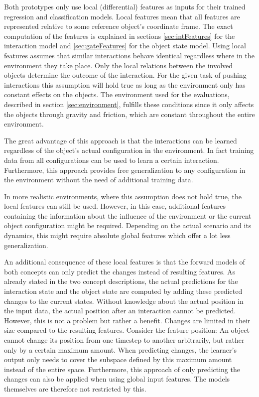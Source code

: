 Both prototypes only use local (differential) features as inputs for their trained regression and classification models. 
Local features mean that all features are represented relative to some reference object's coordinate frame. The exact computation of the features is explained in sections \ref{sec:intFeatures} for the interaction model and \ref{sec:gateFeatures} for the object state model.
Using local features assumes that similar interactions behave identical regardless where in the environment they take place. 
Only the local relations between the involved objects determine the outcome of the interaction. 
For the given task of pushing interactions this assumption will hold true as long as the environment only has constant effects on the objects. The environment used for the evaluations, described in section \ref{sec:environment}, fulfills these conditions since it only affects the objects through gravity and friction, which are constant throughout the entire environment. 

The great advantage of this approach is that the interactions can be learned regardless of the object's actual configuration in the environment. In fact training data from all configurations can be used to learn a certain interaction. Furthermore, this approach provides free generalization to any configuration in the environment without the need of additional training data.

In more realistic environments, where this assumption does not hold true, the local features can still be used. However, in this case, additional features containing the information about the influence of the environment or the current object configuration might be required. Depending on the actual scenario and its dynamics, this might require absolute global features which offer a lot less generalization.

An additional consequence of these local features is that the forward models of both concepts can only predict the changes instead of resulting features. As already stated in the two concept descriptions, the actual predictions for the interaction state and the object state are computed by adding these predicted changes to the current states.
Without knowledge about the actual position in the input data, the actual position after an interaction cannot be predicted. However, this is not a problem but rather a benefit. Changes are limited in their size compared to the resulting features. 
Consider the feature position: An object cannot change its position from one timestep to another arbitrarily, but rather only by a certain maximum amount. When predicting changes, the learner's output only needs to cover the subspace defined by this maximum amount instead of the entire space. Furthermore, this approach of only predicting the changes can also be applied when using global input features. The models themselves are therefore not restricted by this.


